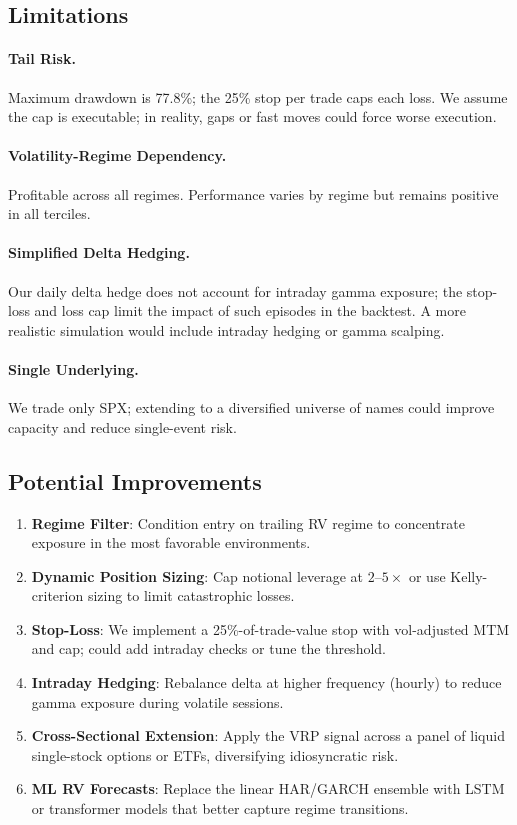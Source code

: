 \documentclass[11pt,a4paper]{article}
\begin{document}
\subsection{Limitations}

\paragraph{Tail Risk.}
Maximum drawdown is 77.8\%; the 25\% stop per trade caps each loss.
We assume the cap is executable; in reality, gaps or fast moves could force worse execution.

\paragraph{Volatility-Regime Dependency.}
Profitable across all regimes. Performance varies by regime but remains positive in all terciles.

\paragraph{Simplified Delta Hedging.}
Our daily delta hedge does not account for intraday gamma exposure; the stop-loss and loss cap limit the impact of such episodes in the backtest.
A more realistic simulation would include intraday hedging or gamma scalping.

\paragraph{Single Underlying.}
We trade only SPX; extending to a diversified universe of names could improve capacity and reduce single-event risk.

\subsection{Potential Improvements}

\begin{enumerate}[nosep]
    \item \textbf{Regime Filter}: Condition entry on trailing RV regime to concentrate exposure in the most favorable environments.
    \item \textbf{Dynamic Position Sizing}: Cap notional leverage at $2\text{--}5\times$ or use Kelly-criterion sizing to limit catastrophic losses.
    \item \textbf{Stop-Loss}: We implement a 25\%-of-trade-value stop with vol-adjusted MTM and cap; could add intraday checks or tune the threshold.
    \item \textbf{Intraday Hedging}: Rebalance delta at higher frequency (hourly) to reduce gamma exposure during volatile sessions.
    \item \textbf{Cross-Sectional Extension}: Apply the VRP signal across a panel of liquid single-stock options or ETFs, diversifying idiosyncratic risk.
    \item \textbf{ML RV Forecasts}: Replace the linear HAR/GARCH ensemble with LSTM or transformer models that better capture regime transitions.
\end{enumerate}
\end{document}

